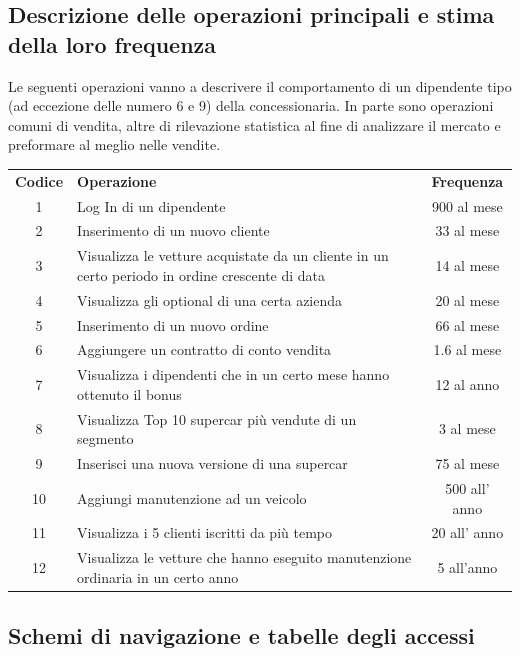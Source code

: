 \documentclass[12pt]{article}
\begin{document}
\subsection{Descrizione delle operazioni principali e stima della loro frequenza}

Le seguenti operazioni vanno a descrivere il comportamento di un dipendente tipo
(ad eccezione delle numero 6 e 9) della concessionaria. In parte sono operazioni
comuni di vendita, altre di rilevazione statistica al fine di analizzare il
mercato e preformare al meglio nelle vendite. 

\begin{table}[htbp]
    \centering
    \small
    \begin{tabularx}{\linewidth}{c X c}
      \rowcolor{red!20!}
      \textbf{Codice} & \textbf{Operazione} & \textbf{Frequenza} \\
      1 & Log In di un dipendente & 900 al mese \\
      2 & Inserimento di un nuovo cliente & 33 al mese \\
      3 & Visualizza le vetture acquistate da un cliente in un certo periodo in
      ordine crescente di data & 14 al mese \\
      4 & Visualizza gli optional di una certa azienda & 20 al mese \\
      5 & Inserimento di un nuovo ordine & 66 al mese \\
      6 & Aggiungere un contratto di conto vendita & 1.6 al mese \\
      7 & Visualizza i dipendenti che in un certo mese hanno ottenuto il bonus &
      12 al anno \\
      8 & Visualizza Top 10 supercar più vendute di un segmento & 3 al mese \\
      9 & Inserisci una nuova versione di una supercar & 75 al mese \\
      10 & Aggiungi manutenzione ad un veicolo & 500 all' anno \\
      11 & Visualizza i 5 clienti iscritti da più tempo &  20 all' anno \\
      12 & Visualizza le vetture che hanno eseguito manutenzione ordinaria in un
      certo anno & 5 all'anno \\
    \end{tabularx}
    \label{tab:tabella_frequenze}
\end{table}
\subsection{Schemi di navigazione e tabelle degli accessi}
\end{document}
